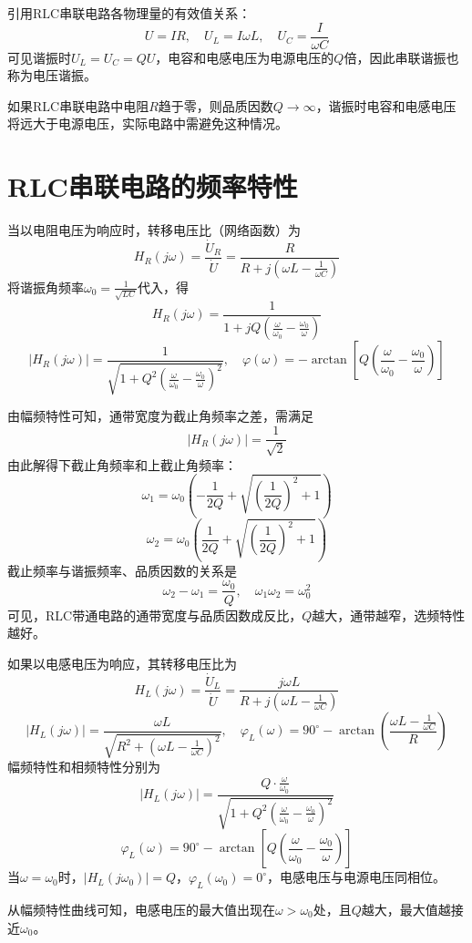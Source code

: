 引用$\mathrm{RLC}$串联电路各物理量的有效值关系：
\[
U = IR, \quad U_L = I\omega L, \quad U_C = \frac{I}{\omega C}
\]
可见谐振时$U_L = U_C = QU$，电容和电感电压为电源电压的$Q$倍，因此串联谐振也称为电压谐振。

如果$\mathrm{RLC}$串联电路中电阻$R$趋于零，则品质因数$Q \to \infty$，谐振时电容和电感电压将远大于电源电压，实际电路中需避免这种情况。

\section{RLC串联电路的频率特性}
当以电阻电压为响应时，转移电压比（网络函数）为
\[
H_R(j\omega) = \frac{\dot{U}_R}{\dot{U}} = \frac{R}{R + j\left(\omega L - \frac{1}{\omega C}\right)}
\]
将谐振角频率$\omega_0 = \frac{1}{\sqrt{LC}}$代入，得
\[
H_R(j\omega) = \frac{1}{1 + jQ\left(\frac{\omega}{\omega_0} - \frac{\omega_0}{\omega}\right)}
\]
\[
|H_R(j\omega)| = \frac{1}{\sqrt{1 + Q^2\left(\frac{\omega}{\omega_0} - \frac{\omega_0}{\omega}\right)^2}}, \quad \varphi(\omega) = -\arctan\left[Q\left(\frac{\omega}{\omega_0} - \frac{\omega_0}{\omega}\right)\right]
\]

由幅频特性可知，通带宽度为截止角频率之差，需满足
\[
|H_R(j\omega)| = \frac{1}{\sqrt{2}}
\]
由此解得下截止角频率和上截止角频率：
\[
\omega_1 = \omega_0 \left(-\frac{1}{2Q} + \sqrt{\left(\frac{1}{2Q}\right)^2 + 1}\right)
\]
\[
\omega_2 = \omega_0 \left(\frac{1}{2Q} + \sqrt{\left(\frac{1}{2Q}\right)^2 + 1}\right)
\]
截止频率与谐振频率、品质因数的关系是
\[
\omega_2 - \omega_1 = \frac{\omega_0}{Q}, \quad \omega_1 \omega_2 = \omega_0^2
\]
可见，$\mathrm{RLC}$带通电路的通带宽度与品质因数成反比，$Q$越大，通带越窄，选频特性越好。

如果以电感电压为响应，其转移电压比为
\[
H_L(j\omega) = \frac{\dot{U}_L}{\dot{U}} = \frac{j\omega L}{R + j\left(\omega L - \frac{1}{\omega C}\right)}
\]
\[
|H_L(j\omega)| = \frac{\omega L}{\sqrt{R^2 + \left(\omega L - \frac{1}{\omega C}\right)^2}}, \quad \varphi_L(\omega) = 90^\circ - \arctan\left(\frac{\omega L - \frac{1}{\omega C}}{R}\right)
\]
幅频特性和相频特性分别为
\[
|H_L(j\omega)| = \frac{Q \cdot \frac{\omega}{\omega_0}}{\sqrt{1 + Q^2\left(\frac{\omega}{\omega_0} - \frac{\omega_0}{\omega}\right)^2}}
\]
\[
\varphi_L(\omega) = 90^\circ - \arctan\left[Q\left(\frac{\omega}{\omega_0} - \frac{\omega_0}{\omega}\right)\right]
\]
当$\omega = \omega_0$时，$|H_L(j\omega_0)| = Q$，$\varphi_L(\omega_0) = 0^\circ$，电感电压与电源电压同相位。

从幅频特性曲线可知，电感电压的最大值出现在$\omega > \omega_0$处，且$Q$越大，最大值越接近$\omega_0$。

